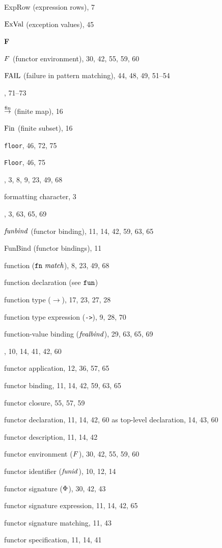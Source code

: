\begin{theindex}
\item ExpRow (expression rows), 7
\item ${\rm ExVal}$ (exception values), 45
\indexspace
\parbox{65mm}{\hfil{\large\bf F}\hfil}
\indexspace
\item $F$ (functor environment), 30, 42, 55, 59, 60
\item ${\rm FAIL}$ (failure in pattern matching), 44, 48, 49, 51--54
\item \FALSE, 71--73
\item $\stackrel{{\rm fin}}{\to}$ (finite map), 16
\item $\mathop{\rm Fin}\nolimits$ (finite subset), 16
\item {\tt floor}, 46, 72, 75
\item {\tt Floor}, 46, 75
\item \FN, 3, 8, 9, 23, 49, 68
\item formatting character, 3
\item \FUN, 3, 63, 65, 69
\item ${\it funbind}$ (functor binding), 11, 14, 42, 59, 63, 65
\item FunBind (functor bindings), 11
\item function ($\mbox{{\tt fn}\ {\it match}}$), 8, 23, 49, 68
\item function declaration (see ${\tt fun}$) 
\item function type ($\rightarrow$), 17, 23, 27, 28
\item function type expression (\verb+->+), 9, 28, 70
\item function-value binding (${\it fvalbind}$), 29, 63, 65, 69
\item \FUNCTOR, 10, 14, 41, 42, 60
\item functor application, 12, 36, 57, 65
\item functor binding, 11, 14, 42, 59, 63, 65
\item functor closure, 55, 57, 59
\item functor declaration, 11, 14, 42, 60
\subitem as top-level declaration, 14, 43, 60
\item functor description, 11, 14, 42
\item functor environment ($F$), 30, 42, 55, 59, 60
\item functor identifier (${\it funid}$), 10, 12, 14
\item functor signature ($\Phi$), 30, 42, 43
\item functor signature expression, 11, 14, 42, 65
\item functor signature matching, 11, 43
\item functor specification, 11, 14, 41

\end{theindex}
